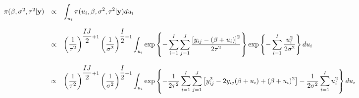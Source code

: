 \documentclass{article}
\begin{document}
\begin{equation*}
\begin{array}{lcl ll }
\pi(\beta, \sigma^2, \tau^2|\textbf{y}) & \propto & \displaystyle\int_{u_i} \pi(u_i,\beta, \sigma^2, \tau^2|\textbf{y}) du_i  \\\\

& \propto & \left(\dfrac{1}{\tau^2}\right)^{\dfrac{IJ}{2}+1} \left(\dfrac{1}{\sigma^2}\right)^{\dfrac{I}{2}+1} \displaystyle\int_{u_i} \mbox{exp}\left\{ - \displaystyle\sum_{i=1}^{I}\sum_{j=1}^{J}\frac{\left[ y_{ij} - (\beta + u_i) \right]^2}{2\tau^2} \right\} \mbox{exp}\left\{ - \displaystyle\sum_{i=1}^{I} \dfrac{u_i^2}{2\sigma^2} \right\} du_i\\\\

& \propto & \left(\dfrac{1}{\tau^2}\right)^{\dfrac{IJ}{2}+1} \left(\dfrac{1}{\sigma^2}\right)^{\dfrac{I}{2}+1} \displaystyle\int_{u_i} \mbox{exp}\left\{ - \dfrac{1}{2\tau^2} \displaystyle\sum_{i=1}^{I}\sum_{j=1}^{J}\left[ y_{ij}^2 - 2y_{ij}(\beta + u_i) + (\beta + u_i)^2 \right] - \dfrac{1}{2\sigma^2}\displaystyle\sum_{i=1}^{I} u_i^2 \right\} du_i\\\\

 \end{array}
\end{equation*}
\end{document}
